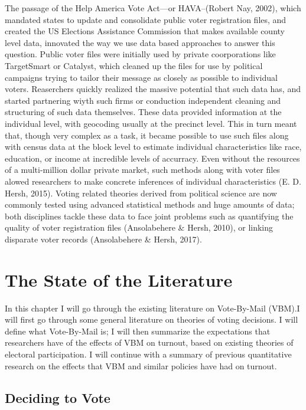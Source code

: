 \documentclass[12pt,twoside]{reedthesis}
\begin{document}
  The passage of the Help America Vote Act---or HAVA--(Robert Nay, 2002),
  which mandated states to update and consolidate public voter
  registration files, and created the US Elections Assistance Commission
  that makes available county level data, innovated the way we use data
  based approaches to answer this question. Public voter files were
  initially used by private coorporations like TargetSmart or Catalyst,
  which cleaned up the files for use by political campaigns trying to
  tailor their message as closely as possible to individual voters.
  Reaserchers quickly realized the massive potential that such data has,
  and started partnering wiyth such firms or conduction independent
  cleaning and structuring of such data themselves. These data provided
  information at the individual level, with geocoding usually at the
  precinct level. This in turn meant that, though very complex as a task,
  it became possible to use such files along with census data at the block
  level to estimate individual characteristics like race, education, or
  income at incredible levels of accurracy. Even without the resources of
  a multi-million dollar private market, such methods along with voter
  files alowed researchers to make concrete inferences of individual
  characteristics (E. D. Hersh, 2015). Voting related theories derived
  from political science are now commonly tested using advanced
  statistical methods and huge amounts of data; both disciplines tackle
  these data to face joint problems such as quantifying the quality of
  voter registration files (Ansolabehere \& Hersh, 2010), or linking
  disparate voter records (Ansolabehere \& Hersh, 2017).
  
  \chapter{The State of the Literature}\label{rmd-basics}
  
  In this chapter I will go through the existing literature on
  Vote-By-Mail (VBM).I will first go through some general literature on
  theories of voting decisions. I will define what Vote-By-Mail is; I will
  then summarize the expectations that researchers have of the effects of
  VBM on turnout, based on existing theories of electoral participation. I
  will continue with a summary of previous quantitative research on the
  effects that VBM and similar policies have had on turnout.
  
  \section{Deciding to Vote}\label{deciding-to-vote}
  
\end{document}
